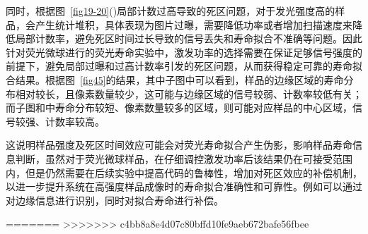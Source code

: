 同时，根据图~\ref{fig19-20}()局部计数过高导致的死区问题，对于发光强度高的样品，会产生统计堆积，具体表现为图片过曝，需要降低功率或者增加扫描速度来降低局部计数率，避免死区时间过长导致的信号丢失和寿命拟合不准确等问题。因此针对荧光微球进行的荧光寿命实验中，激发功率的选择需要在保证足够信号强度的前提下，避免局部过曝和过高计数率引发的死区问题，从而获得稳定可靠的寿命拟合结果。根据图~\ref{fig45}的结果，其中子图中可以看到，样品的边缘区域的寿命分布相对较长，且像素数量较少，这可能与边缘区域的信号较弱、计数率较低有关；而子图和中寿命分布较短、像素数量较多的区域，则可能对应样品的中心区域，信号较强、计数率较高。

这说明样品强度及死区时间效应可能会对荧光寿命拟合产生伪影，影响样品寿命信息判断，虽然对于荧光微球样品，在仔细调控激发功率后该结果仍在可接受范围内，但是仍然需要在后续实验中提高代码的鲁棒性，增加对死区效应的补偿机制，以进一步提升系统在高强度样品成像时的寿命拟合准确性和可靠性。例如可以通过对边缘信息进行识别，同时对拟合寿命进行补偿。




=======
>>>>>>> c4bb8a8e4d07c80bffd10fe9aeb672bafe56fbee
